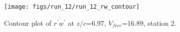 \begin{figure}[H]
\centering
\texttt{[image: figs/run\_12/run\_12\_rw\_contour]}
\caption{Contour plot of $\overline{r^\prime w^\prime}$ at $z/c$=6.97, $V_{free}$=16.89, station 2.}
\label{fig:run_12_rw_contour}
\end{figure}



